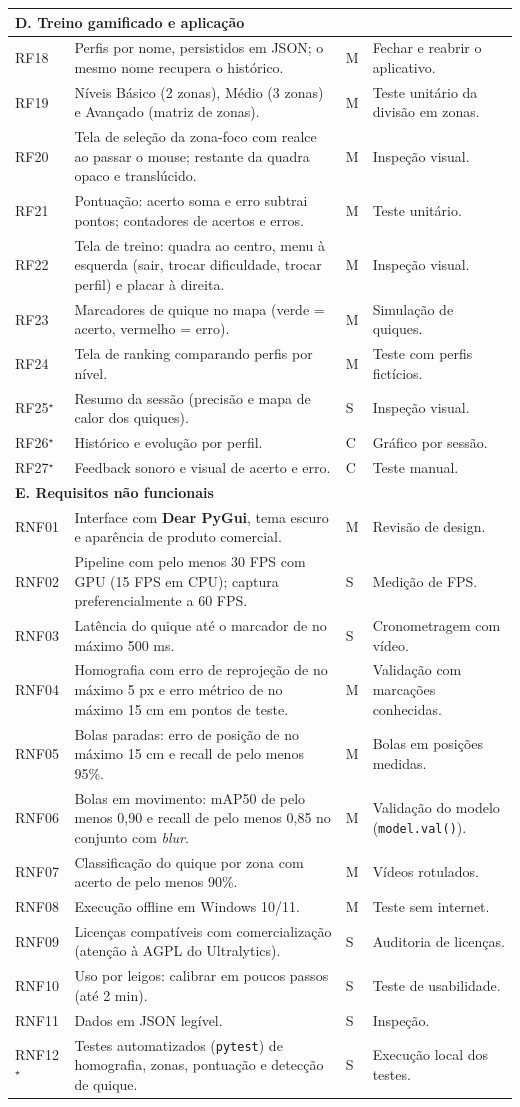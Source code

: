 \documentclass[a4paper,11pt]{article}
\newcommand{\req}[4]{#1 & #2 & \centering #3 & #4 \\ \hline}
\newcommand{\reccat}[1]{\multicolumn{4}{l}{\cellcolor{blue!15}\textbf{#1}} \\ \hline}
\begin{document}
\begin{center}
\begin{longtable}{|p{1.3cm}|p{7.3cm}|p{0.9cm}|p{6.0cm}|}
\reccat{D. Treino gamificado e aplicação}
\req{RF18}{Perfis por nome, persistidos em JSON; o mesmo nome recupera o histórico.}{M}{Fechar e reabrir o aplicativo.}
\req{RF19}{Níveis Básico (2 zonas), Médio (3 zonas) e Avançado (matriz de zonas).}{M}{Teste unitário da divisão em zonas.}
\req{RF20}{Tela de seleção da zona-foco com realce ao passar o mouse; restante da quadra opaco e translúcido.}{M}{Inspeção visual.}
\req{RF21}{Pontuação: acerto soma e erro subtrai pontos; contadores de acertos e erros.}{M}{Teste unitário.}
\req{RF22}{Tela de treino: quadra ao centro, menu à esquerda (sair, trocar dificuldade, trocar perfil) e placar à direita.}{M}{Inspeção visual.}
\req{RF23}{Marcadores de quique no mapa (verde = acerto, vermelho = erro).}{M}{Simulação de quiques.}
\req{RF24}{Tela de ranking comparando perfis por nível.}{M}{Teste com perfis fictícios.}
\req{RF25$^{\star}$}{Resumo da sessão (precisão e mapa de calor dos quiques).}{S}{Inspeção visual.}
\req{RF26$^{\star}$}{Histórico e evolução por perfil.}{C}{Gráfico por sessão.}
\req{RF27$^{\star}$}{Feedback sonoro e visual de acerto e erro.}{C}{Teste manual.}

\reccat{E. Requisitos não funcionais}
\req{RNF01}{Interface com \textbf{Dear PyGui}, tema escuro e aparência de produto comercial.}{M}{Revisão de design.}
\req{RNF02}{Pipeline com pelo menos 30 FPS com GPU (15 FPS em CPU); captura preferencialmente a 60 FPS.}{S}{Medição de FPS.}
\req{RNF03}{Latência do quique até o marcador de no máximo 500 ms.}{S}{Cronometragem com vídeo.}
\req{RNF04}{Homografia com erro de reprojeção de no máximo 5 px e erro métrico de no máximo 15 cm em pontos de teste.}{M}{Validação com marcações conhecidas.}
\req{RNF05}{Bolas paradas: erro de posição de no máximo 15 cm e recall de pelo menos 95\%.}{M}{Bolas em posições medidas.}
\req{RNF06}{Bolas em movimento: mAP50 de pelo menos 0,90 e recall de pelo menos 0,85 no conjunto com \textit{blur}.}{M}{Validação do modelo (\texttt{model.val()}).}
\req{RNF07}{Classificação do quique por zona com acerto de pelo menos 90\%.}{M}{Vídeos rotulados.}
\req{RNF08}{Execução offline em Windows 10/11.}{M}{Teste sem internet.}
\req{RNF09}{Licenças compatíveis com comercialização (atenção à AGPL do Ultralytics).}{S}{Auditoria de licenças.}
\req{RNF10}{Uso por leigos: calibrar em poucos passos (até 2 min).}{S}{Teste de usabilidade.}
\req{RNF11}{Dados em JSON legível.}{S}{Inspeção.}
\req{RNF12$^{\star}$}{Testes automatizados (\texttt{pytest}) de homografia, zonas, pontuação e detecção de quique.}{S}{Execução local dos testes.}
\end{longtable}
\end{center}
\end{document}
